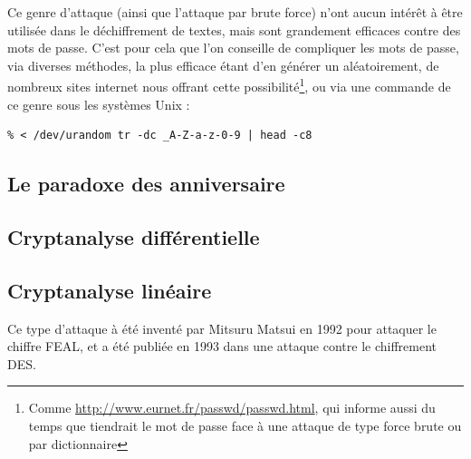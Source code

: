Ce genre d'attaque (ainsi que l'attaque par brute force) n'ont
aucun intérêt à être utilisée dans le déchiffrement de textes,
mais sont grandement efficaces contre des mots de passe. C'est
pour cela que l'on conseille de compliquer les mots de passe, via
diverses méthodes, la plus efficace étant d'en générer un
aléatoirement, de nombreux sites internet nous offrant cette
possibilité\footnote{Comme
\url{http://www.eurnet.fr/passwd/passwd.html}, qui informe aussi
du temps que tiendrait le mot de passe face à une attaque de type
force brute ou par dictionnaire}, ou via une commande de ce genre sous les systèmes
Unix :
\lstset{language=bash}
\begin{lstlisting}
% < /dev/urandom tr -dc _A-Z-a-z-0-9 | head -c8 
\end{lstlisting}

\subsection{Le paradoxe des anniversaire}

\subsection{Cryptanalyse différentielle}

\subsection{Cryptanalyse linéaire}
Ce type d'attaque à été inventé par Mitsuru Matsui en 1992 pour
attaquer le chiffre FEAL, et a été publiée en 1993  dans une
attaque contre le chiffrement DES.


